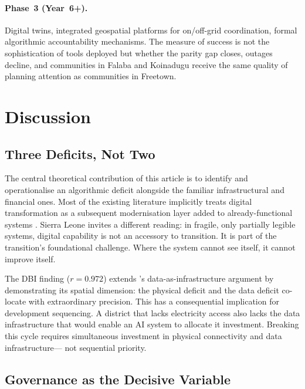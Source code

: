 \documentclass[preprint,12pt]{elsarticle}
\begin{document}
\paragraph{Phase~3 (Year~6+).}
Digital twins, integrated geospatial platforms for
on/off-grid coordination, formal algorithmic accountability
mechanisms. The measure of success is not the sophistication
of tools deployed but whether the parity gap closes,
outages decline, and communities in Falaba and Koinadugu
receive the same quality of planning attention as
communities in Freetown.

\section{Discussion}
\label{sec:discussion}

\subsection{Three Deficits, Not Two}

The central theoretical contribution of this article is to
identify and operationalise an algorithmic deficit alongside
the familiar infrastructural and financial ones. Most of the
existing literature implicitly treats digital transformation
as a subsequent modernisation layer added to already-functional
systems \cite{Arevalo2024, Yousef2023}. Sierra Leone invites
a different reading: in fragile, only partially legible
systems, digital capability is not an accessory to transition.
It is part of the transition's foundational challenge. Where
the system cannot see itself, it cannot improve itself.

The DBI finding ($r = 0.972$) extends
\citeauthor{Kitchin2014}'s \citeyearpar{Kitchin2014}
data-as-infrastructure argument by demonstrating its spatial
dimension: the physical deficit and the data deficit
co-locate with extraordinary precision. This has a
consequential implication for development sequencing.
A district that lacks electricity access also lacks the data
infrastructure that would enable an AI system to allocate
it investment. Breaking this cycle requires simultaneous
investment in physical connectivity and data infrastructure---
not sequential priority.

\subsection{Governance as the Decisive Variable}
\end{document}
